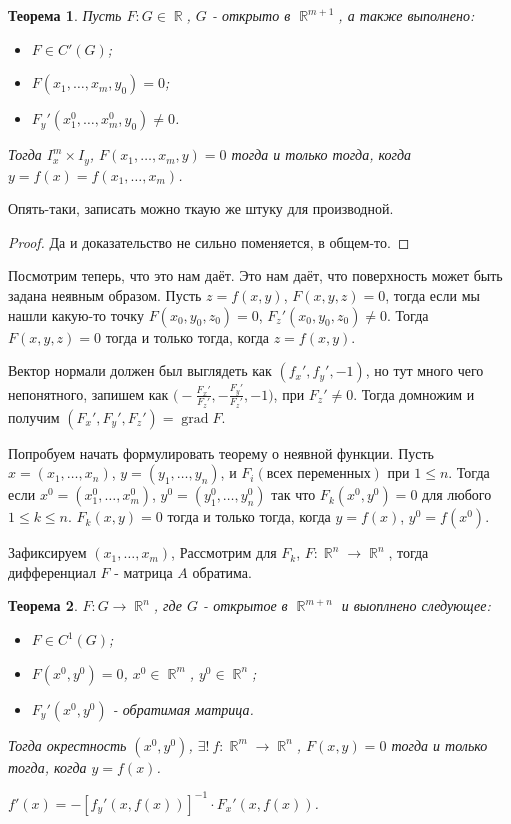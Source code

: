 \documentclass[a4paper,100pt]{article}
\theoremstyle{indented}
\newtheorem{theorem}{Теорема}
\theoremstyle{definition}
\theoremstyle{remark}
\DeclareMathOperator{\RR}{\mathbb{R}}
\DeclareMathOperator{\grad}{grad}
\begin{document}
\begin{theorem}
    Пусть $F:G\in \RR$, $G$ - открыто в $\RR^{m+1}$, а также выполнено: 

    \begin{itemize}
        \item $F\in C'(G)$; 
        \item $F(x_1, \ldots, x_m, y_0)=0$; 
        \item $F_y'(x_1^0, \ldots, x_m^0, y_0)\neq 0$. 
    \end{itemize}

    Тогда $I_x^m\times I_y$, $F(x_1, \ldots, x_m, y)=0$ тогда и только тогда, когда $y=f(x)=f(x_1, \ldots, x_m)$. 
\end{theorem}

Опять-таки, записать можно ткаую же штуку для производной.

\begin{proof}
    Да и доказательство не сильно поменяется, в общем-то.
\end{proof}

Посмотрим теперь, что это нам даёт. Это нам даёт, что поверхность может быть задана неявным образом. Пусть $z=f(x, y)$, $F(x, y, z)=0$, тогда если мы нашли какую-то точку $F(x_0, y_0, z_0)=0$, $F_z'(x_0, y_0, z_0)\neq 0$. Тогда $F(x, y, z)=0$ тогда и только тогда, когда $z=f(x, y)$. \ 

Вектор нормали должен был выглядеть как $(f_x', f_y', -1)$, но тут много чего непонятного, запишем как $\biggl( -\frac{F_x'}{F_z'}, -\frac{F_y'}{F_z'}, -1\biggr)$, при $F_z'\neq 0$. Тогда домножим и получим $(F_x', F_y', F_z')=\grad F$. \ 


Попробуем начать формулировать теорему о неявной функции. Пусть $x=(x_1, \ldots, x_n)$, $y=(y_1, \ldots, y_n)$, и $F_i(\text{всех переменных})$ при $1\leq n$. Тогда если $x^0=(x_1^0, \ldots, x_m^0)$, $y^0=(y_1^0, \ldots, y_n^0)$ так что $F_k(x^0, y^0)=0$ для любого $1\leq k\leq n$. $F_k(x, y)=0$ тогда и только тогда, когда $y=f(x)$, $y^0=f(x^0)$. \ 

Зафиксируем $(x_1, \ldots, x_m)$, Рассмотрим для $F_k$, $F:\RR^n\rightarrow \RR^n$, тогда дифференциал $F$ - матрица $A$ обратима. \\

\begin{theorem}
    $F: G\rightarrow \RR^n$, где $G$ - открытое в $\RR^{m+n}$ и выоплнено следующее: 

    \begin{itemize}
        \item $F \in C^1(G)$; 
        \item $F(x^0, y^0)=0$, $x^0\in \RR^m$, $y^0\in \RR^n$; 
        \item $F_y'(x^0, y^0)$ - обратимая матрица.
    \end{itemize}

    Тогда окрестность $(x^0, y^0)$, $\exists ! \: f:\RR^m\rightarrow \RR^n$, $F(x, y)=0$ тогда и только тогда, когда $y=f(x)$. \ 

    $f'(x)=-[f_y'(x, f(x))]^{-1}\cdot F_x'(x, f(x))$. 
\end{theorem}
\end{document}
